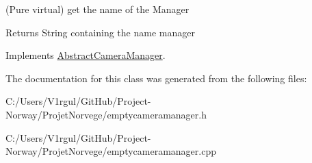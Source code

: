 (Pure virtual) get the name of the Manager 

\begin{DoxyReturn}{Returns}
String containing the name manager 
\end{DoxyReturn}


Implements \hyperlink{class_abstract_camera_manager_a6e4b041842471b9ed42ddd5c9ab260d1}{Abstract\-Camera\-Manager}.



The documentation for this class was generated from the following files\-:\begin{DoxyCompactItemize}
\item 
C\-:/\-Users/\-V1rgul/\-Git\-Hub/\-Project-\/\-Norway/\-Projet\-Norvege/emptycameramanager.\-h\item 
C\-:/\-Users/\-V1rgul/\-Git\-Hub/\-Project-\/\-Norway/\-Projet\-Norvege/emptycameramanager.\-cpp\end{DoxyCompactItemize}

